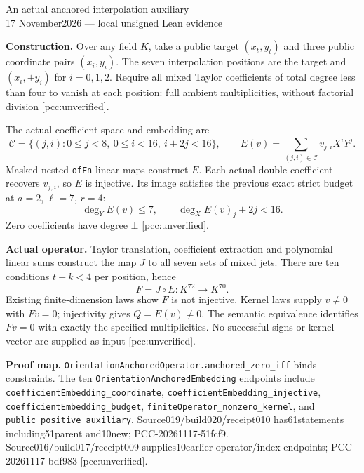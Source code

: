 \documentclass[10pt]{article}
\begin{document}
\begin{center}{\Large An actual anchored interpolation auxiliary}\\[4pt]
17 November2026 --- local unsigned Lean evidence\end{center}
\textbf{Construction.} Over any field $K$, take a public target $(x_t,y_t)$
and three public coordinate pairs $(x_i,y_i)$. The seven interpolation
positions are the target and $(x_i,\pm y_i)$ for $i=0,1,2$.
Require all mixed Taylor coefficients of total degree less than four
to vanish at each position: full ambient multiplicities,
without factorial division [pcc:unverified].

The actual coefficient space and embedding are
\[
 \mathcal C=\{(j,i):0\le j<8,\ 0\le i<16,\ i+2j<16\},\qquad
 E(v)=\sum_{(j,i)\in\mathcal C}v_{j,i}X^iY^j.
\]
Masked nested \texttt{ofFn} linear maps construct $E$.
Each actual double coefficient recovers $v_{j,i}$, so $E$ is injective.
Its image satisfies the previous exact strict budget at
$a=2$, $\ell=7$, $r=4$:
\[
 \deg_Y E(v)\le7,\qquad \deg_X E(v)_j+2j<16.
\]
Zero coefficients have degree $\bot$ [pcc:unverified].

\textbf{Actual operator.}
Taylor translation, coefficient extraction and polynomial linear sums
construct the map $J$ to all seven sets of mixed jets.
There are ten conditions $t+k<4$ per position, hence
\[
 F=J\circ E:K^{72}\longrightarrow K^{70}.
\]
Existing finite-dimension laws show $F$ is not injective.
Kernel laws supply $v\ne0$ with $Fv=0$; injectivity gives $Q=E(v)\ne0$.
The semantic equivalence identifies $Fv=0$ with exactly the specified
multiplicities. No successful signs or kernel vector are supplied as input
[pcc:unverified].

\textbf{Proof map.}
\texttt{OrientationAnchoredOperator.anchored\_zero\_iff} binds constraints.
The ten \texttt{OrientationAnchoredEmbedding} endpoints include
\texttt{coefficientEmbedding\_coordinate},
\texttt{coefficientEmbedding\_injective},
\texttt{coefficientEmbedding\_budget},
\texttt{finiteOperator\_nonzero\_kernel}, and
\texttt{public\_positive\_auxiliary}.
Source019/build020/receipt010 has61statements including51parent and10new;
PCC-20261117-51fcf9. Source016/build017/receipt009 supplies10earlier
operator/index endpoints; PCC-20261117-bdf983 [pcc:unverified].
\end{document}
